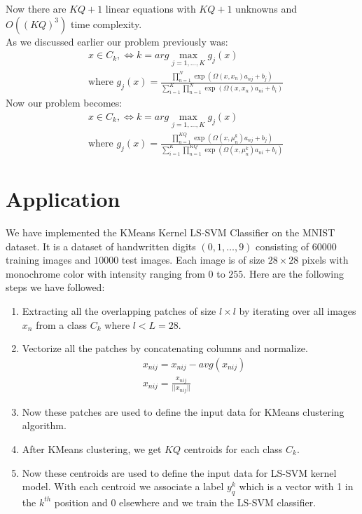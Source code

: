 \documentclass[conference]{IEEEtran}
\begin{document}
    Now there are $KQ+1$ linear equations with $KQ+1$ unknowns and $O((KQ)^3)$ time complexity. \\
    As we discussed earlier our problem previously was:
    \begin{align*}
        & x \in C_{k}, \Leftrightarrow k= arg \max_{j=1,\ldots,K} g_{j}(x) \\
        & \text{where } g_{j}(x) = \frac{\prod_{n=1}^{N}\exp(\Omega(x,x_{n})a_{nj} + b_{j})}{\sum_{i=1}^{K} \prod_{n=1}^{N}\exp(\Omega(x,x_{n})a_{ni} + b_{i})}
    \end{align*}
    Now our problem becomes:
    \begin{align*}
        & x \in C_{k}, \Leftrightarrow k= arg \max_{j=1,\ldots,K} g_{j}(x) \\
        & \text{where } g_{j}(x) = \frac{\prod_{n=1}^{KQ}\exp(\Omega(x,\mu_{n}^{k})a_{nj} + b_{j})}{\sum_{i=1}^{K} \prod_{n=1}^{KQ}\exp(\Omega(x,\mu_{n}^{k})a_{ni} + b_{i})}
    \end{align*}


    \section{Application}\label{sec:application}
    We have implemented the KMeans Kernel LS-SVM Classifier on the MNIST dataset.
    It is a dataset of handwritten digits $(0,1,\ldots,9)$ consisting of $60000$ training images and $10000$ test images.
    Each image is of size $28 \times 28$ pixels with monochrome color
    with intensity ranging from $0$ to $255$.
    Here are the following steps we have followed:
    \begin{enumerate}
        \item Extracting all the overlapping patches of size $l \times l$ by iterating over all images $x_{n}$ from a
        class $C_{k}$ where $l<L=28$.
        \item Vectorize all the patches by concatenating columns and normalize.
        \begin{align*}
            & x_{nij} = x_{nij} - avg(x_{nij}) \\
            & x_{nij} = \frac{x_{nij}}{||x_{nij}||}
        \end{align*}
        \item Now these patches are used to define the input data for KMeans clustering algorithm.
        \item After KMeans clustering, we get $KQ$ centroids for each class $C_{k}$.
        \item Now these centroids are used to define the input data for LS-SVM kernel model.
        With each centroid we associate a label $y_{q}^{k}$ which is a vector with 1 in the $k^{th}$ position and
        $0$ elsewhere and we train the LS-SVM classifier.
    \end{enumerate}
\end{document}
